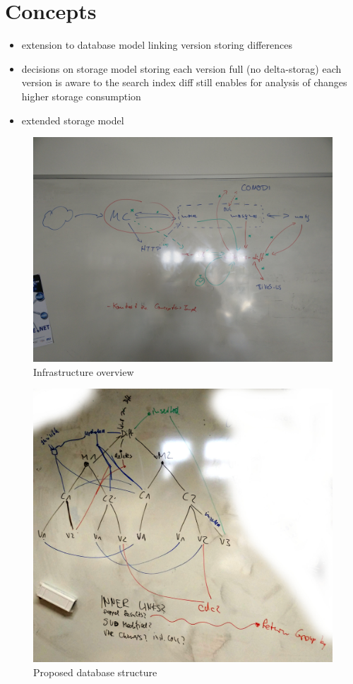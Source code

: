 \section{Concepts}

\begin{itemize}
\item extension to database model
	\subitem linking version
	\subitem storing differences
\item decisions on storage model
	\subitem storing each version full (no delta-storag)
	\subitem each version is aware to the search index
	\subitem diff still enables for analysis of changes
	\subitem higher storage consumption
\item extended storage model
\end{itemize}

\begin{figure}
	\includegraphics[width=\textwidth]{resources/system_overview.jpg}
	\caption{Infrastructure overview}
	\label{fig:system-overview}
\end{figure}

\begin{figure}
	\includegraphics[width=\textwidth]{resources/db_structure.jpg}
	\caption{Proposed database structure}
	\label{fig:db-model}
\end{figure}
